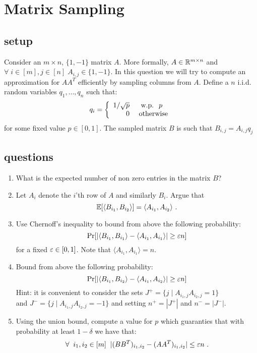 \documentclass{article}
\begin{document}
\section{Matrix Sampling}
\subsection*{setup}
Consider an $m \times n$, $\{1,-1\}$ matrix $A$. More formally, $A \in {\mathbb{R}}^{m\times n}$ and $\forall \;i \in [m], j\in[n] \; A_{i,j} \in \{1,-1\}$.
In this question we will try to compute an approximation for $AA^T$ efficiently by sampling columns from $A$.
Define a $n$ i.i.d. random variables $q_1,\ldots,q_n$ such that:
\begin{equation*}
q_i = \left\{ 
\begin{array}{rl}
1/\sqrt{p} & \mbox{\; w.p. \;} p \\
0 &\mbox{ otherwise}
\end{array} 
\right.
\end{equation*}
for some fixed value $p \in [0,1]$.
The sampled matrix $B$ is such that $B_{i,j} = A_{i,j}q_j$


\subsection*{questions}
\begin{enumerate}
\item What is the expected number of non zero entries in the matrix $B$?
\item Let $A_{i}$ denote the $i$'th row of $A$ and similarly $B_{i}$. Argue that $${\mathbb E}[\langle B_{i_1}, B_{i_2} \rangle] =  \langle A_{i_1}, A_{i_2} \rangle \ . $$
\item Use Chernoff's inequality to bound from above the following probability:
\[
\Pr[ | \langle B_{i_1}, B_{i_1} \rangle - \langle A_{i_1}, A_{i_1} \rangle | \ge \varepsilon n ]
\]
for a fixed $\varepsilon \in [0,1]$. Note that $\langle A_{i_1}, A_{i_1} \rangle = n$.
\item Bound from above the following probability:
\[
\Pr[ | \langle B_{i_1}, B_{i_2} \rangle - \langle A_{i_1}, A_{i_2} \rangle | \ge \varepsilon n ] 
\]
Hint: it is convenient to consider the sets $ J^{+} = \{ j \;| \;A_{i_1,j} A_{i_2,j} = 1\}$ \\and $ J^{-} = \{ j \;| \;A_{i_1,j} A_{i_2,j} = -1\}$
and setting $n^{+} = |J^{+}|$ and $n^{-} = |J^{-}|$.

\item Using the union bound, compute a value for $p$ which guaranties that with probability at least $1-\delta$ we have that:
$$ \forall \;\;  i_1,i_2 \in [m] \;\;   |(BB^T)_{i_1,i_2}  - (AA^T)_{i_1,i_2}| \le \eps n \ . $$
\end{enumerate}
\pagebreak
\end{document}
